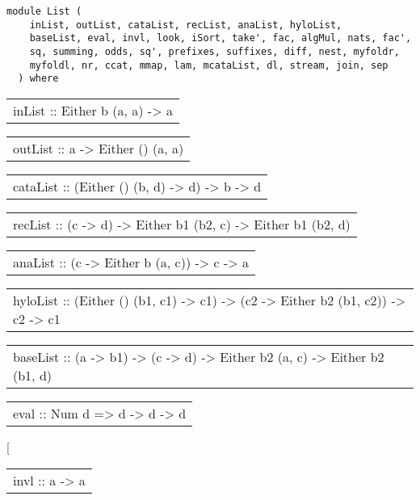 \label{module:List}
\haddockbeginheader
{\haddockverb\begin{verbatim}
module List (
    inList, outList, cataList, recList, anaList, hyloList,
    baseList, eval, invl, look, iSort, take', fac, algMul, nats, fac',
    sq, summing, odds, sq', prefixes, suffixes, diff, nest, myfoldr,
    myfoldl, nr, ccat, mmap, lam, mcataList, dl, stream, join, sep
  ) where\end{verbatim}}
\haddockendheader

\begin{haddockdesc}
\item[\begin{tabular}{@{}l}
inList :: Either b (a, {\char 91}a{\char 93}) -> {\char 91}a{\char 93}
\end{tabular}]
\item[\begin{tabular}{@{}l}
outList :: {\char 91}a{\char 93} -> Either () (a, {\char 91}a{\char 93})
\end{tabular}]
\item[\begin{tabular}{@{}l}
cataList :: (Either () (b, d) -> d) -> {\char 91}b{\char 93} -> d
\end{tabular}]
\item[\begin{tabular}{@{}l}
recList :: (c -> d) -> Either b1 (b2, c) -> Either b1 (b2, d)
\end{tabular}]
\item[\begin{tabular}{@{}l}
anaList :: (c -> Either b (a, c)) -> c -> {\char 91}a{\char 93}
\end{tabular}]
\item[\begin{tabular}{@{}l}
hyloList :: (Either () (b1, c1) -> c1) -> (c2 -> Either b2 (b1, c2)) -> c2 -> c1
\end{tabular}]
\item[\begin{tabular}{@{}l}
baseList :: (a -> b1) -> (c -> d) -> Either b2 (a, c) -> Either b2 (b1, d)
\end{tabular}]
\item[\begin{tabular}{@{}l}
eval :: Num d => d -> {\char 91}d{\char 93} -> d
\end{tabular}]
\item[\begin{tabular}{@{}l}
invl :: {\char 91}a{\char 93} -> {\char 91}a{\char 93}

\end{tabular}
\end{haddockdesc}
